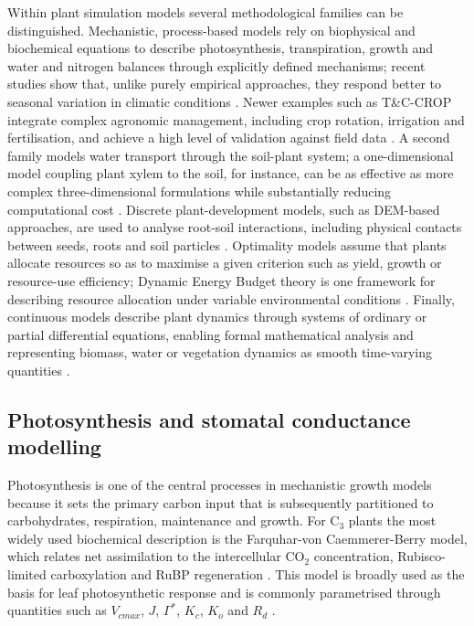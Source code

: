 \documentclass[a4paper,fleqn]{cas-sc}
\begin{document}
Within plant simulation models several methodological families can be distinguished. Mechanistic, process-based models rely on biophysical and biochemical equations to describe photosynthesis, transpiration, growth and water and nitrogen balances through explicitly defined mechanisms; recent studies show that, unlike purely empirical approaches, they respond better to seasonal variation in climatic conditions \cite{Mamassi2024}. Newer examples such as T\&C-CROP integrate complex agronomic management, including crop rotation, irrigation and fertilisation, and achieve a high level of validation against field data \cite{BuckleyPaules2025}. A second family models water transport through the soil-plant system; a one-dimensional model coupling plant xylem to the soil, for instance, can be as effective as more complex three-dimensional formulations while substantially reducing computational cost \cite{Janott2011}. Discrete plant-development models, such as DEM-based approaches, are used to analyse root-soil interactions, including physical contacts between seeds, roots and soil particles \cite{Tian2024}. Optimality models assume that plants allocate resources so as to maximise a given criterion such as yield, growth or resource-use efficiency; Dynamic Energy Budget theory is one framework for describing resource allocation under variable environmental conditions \cite{Russo2022}. Finally, continuous models describe plant dynamics through systems of ordinary or partial differential equations, enabling formal mathematical analysis and representing biomass, water or vegetation dynamics as smooth time-varying quantities \cite{Meron2019}.

\subsection{Photosynthesis and stomatal conductance modelling}

Photosynthesis is one of the central processes in mechanistic growth models because it sets the primary carbon input that is subsequently partitioned to carbohydrates, respiration, maintenance and growth. For C$_3$ plants the most widely used biochemical description is the Farquhar-von Caemmerer-Berry model, which relates net assimilation to the intercellular CO$_2$ concentration, Rubisco-limited carboxylation and RuBP regeneration \cite{Farquhar1980}. This model is broadly used as the basis for leaf photosynthetic response and is commonly parametrised through quantities such as $V_{cmax}$, $J$, $\Gamma^*$, $K_c$, $K_o$ and $R_d$ \cite{Sharkey2007,Dubois2007}.
\end{document}
